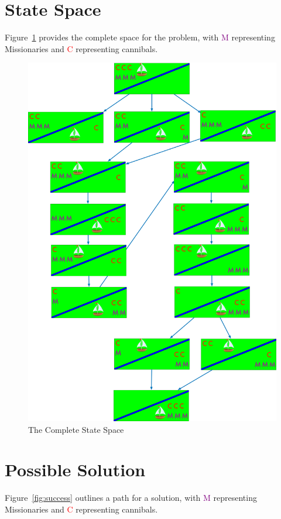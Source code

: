 \documentclass[12pt]{scrartcl}
\begin{document}
\section{State Space}
Figure~\ref{fig:state_space} provides the complete space for the problem, with \textcolor{purple}{M} representing Missionaries and \textcolor{red}{C} representing cannibals.

\begin{figure}[htpb]
    \centering
    \includegraphics[width=.9\textwidth]{./assets/2.1-diagram.png}
    \caption{The Complete State Space}\label{fig:state_space}
\end{figure}

\section{Possible Solution}
Figure~\ref{fig:success} outlines a path for a solution, with \textcolor{purple}{M} representing Missionaries and \textcolor{red}{C} representing cannibals.
\end{document}
